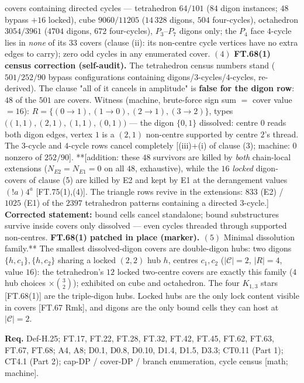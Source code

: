 \begin{theorem}
covers containing directed cycles — tetrahedron $64/101$ ($84$ digon instances; $48$ bypass $+16$ locked), cube $9060/11205$ ($14\,328$ digons, $504$ four-cycles), octahedron $3054/3961$ ($4704$ digons, $672$ four-cycles), $P_3$–$P_7$ digons only; the $P_4$ face $4$-cycle lies in \textit{none} of its $33$ covers (clause (ii): its non-centre cycle vertices have no extra edges to carry); zero odd cycles in any enumerated cover. $(4)$ \textbf{FT.68(1) census correction (self-audit).} The tetrahedron census numbers stand ($501/252/90$ bypass configurations containing digons/$3$-cycles/$4$-cycles, re-derived). The clause "all of it cancels in amplitude" is \textbf{false for the digon row}: $48$ of the $501$ are covers. Witness (machine, brute-force sign sum $=$ cover value $=16$): $R=\{(0{\to}1),(1{\to}0),(2{\to}1),(3{\to}2)\}$, types $\bigl((1,1),(2,1),(1,1),(0,1)\bigr)$ — the digon $\{0,1\}$ dissolved: centre $0$ reads both digon edges, vertex $1$ is a $(2,1)$ non-centre supported by centre $2$'s thread. The $3$-cycle and $4$-cycle rows cancel completely [(iii)+(i) of clause (3); machine: $0$ nonzero of $252/90$]. **[addition: these $48$ survivors are killed by \textit{both} chain-local extensions ($N_{E2}=N_{E1}=0$ on all $48$, exhaustive), while the $16$ \textit{locked} digon-covers of clause (5) are killed by E2 and kept by E1 at the derangement values $(!a)4^a$ [FT.75(1),(4)]. The triangle rows revive in the extensions: $833$ (E2) / $1025$ (E1) of the $2397$ tetrahedron patterns containing a directed $3$-cycle.]\textbf{ Corrected statement: }bound cells cancel standalone; bound substructures survive inside covers only dissolved — even cycles threaded through supported non-centres.\textbf{ FT.68(1) patched in place (marker). $(5)$ }Minimal dissolution family.** The smallest dissolved-digon covers are double-digon hubs: two digons $\{h,c_1\},\{h,c_2\}$ sharing a locked $(2,2)$ hub $h$, centres $c_1,c_2$ ($|\mathcal C|=2$, $|R|=4$, value $16$): the tetrahedron's $12$ locked two-centre covers are exactly this family ($4$ hub choices $\times\binom32$); exhibited on cube and octahedron. The four $K_{1,3}$ stars [FT.68(1)] are the triple-digon hubs. Locked hubs are the only lock content visible in covers [FT.67 Rmk], and digons are the only bound cells they can host at $|\mathcal C|=2$.

\textbf{Req.} Def-H.25; FT.17, FT.22, FT.28, FT.32, FT.42, FT.45, FT.62, FT.63, FT.67, FT.68; A4, A8; D0.1, D0.8, D0.10, D1.4, D1.5, D3.3; CT0.11 (Part 1); CT4.1 (Part 2); cap-DP / cover-DP / branch enumeration, cycle census [math; machine].


\end{theorem}
